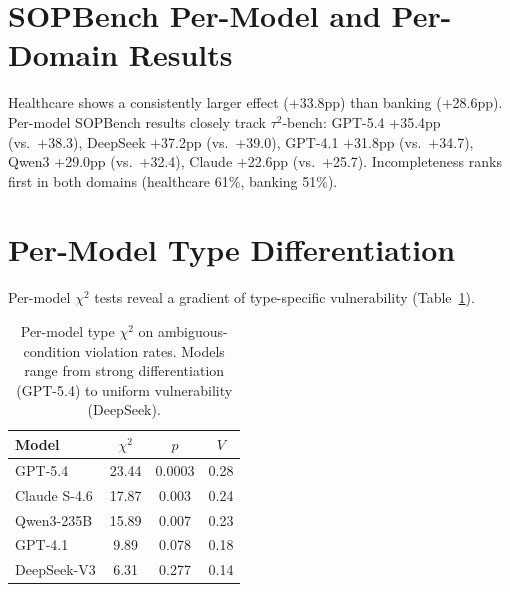 \documentclass[11pt,a4paper]{article}
\begin{document}
\section{SOPBench Per-Model and Per-Domain Results}
\label{app:sopbench_detail}

Healthcare shows a consistently larger effect (+33.8pp) than banking (+28.6pp). Per-model SOPBench results closely track $\tau^2$-bench: GPT-5.4 +35.4pp (vs.\ +38.3), DeepSeek +37.2pp (vs.\ +39.0), GPT-4.1 +31.8pp (vs.\ +34.7), Qwen3 +29.0pp (vs.\ +32.4), Claude +22.6pp (vs.\ +25.7). Incompleteness ranks first in both domains (healthcare 61\%, banking 51\%).

\section{Per-Model Type Differentiation}
\label{app:permodel_chi2}

Per-model $\chi^2$ tests reveal a gradient of type-specific vulnerability (Table~\ref{tab:permodel}).

\begin{table}[h]
\centering
\small
\caption{Per-model type $\chi^2$ on ambiguous-condition violation rates. Models range from strong differentiation (GPT-5.4) to uniform vulnerability (DeepSeek).}
\label{tab:permodel}
\begin{tabular}{lccc}
\toprule
\textbf{Model} & \textbf{$\chi^2$} & \textbf{$p$} & \textbf{$V$} \\
\midrule
GPT-5.4 & 23.44 & 0.0003 & 0.28 \\
Claude S-4.6 & 17.87 & 0.003 & 0.24 \\
Qwen3-235B & 15.89 & 0.007 & 0.23 \\
GPT-4.1 & 9.89 & 0.078 & 0.18 \\
DeepSeek-V3 & 6.31 & 0.277 & 0.14 \\
\bottomrule
\end{tabular}
\end{table}
\end{document}
